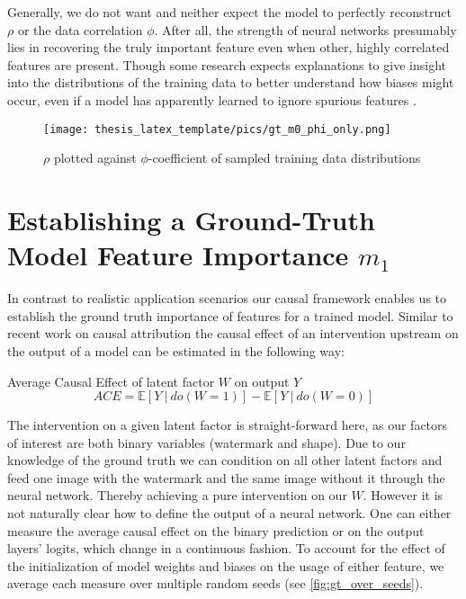 Generally, we do not want and neither expect the model to perfectly reconstruct $\rho$ or the data correlation $\phi$. After all, the strength of neural networks presumably lies in recovering the truly important feature even when other, highly correlated features are present. Though some research expects explanations to give insight into the distributions of the training data to better understand how biases might occur, even if a model has apparently learned to ignore spurious features \cite{Kindermans2017}. 

\begin{figure}
    \centering
    \texttt{[image: thesis\_latex\_template/pics/gt\_m0\_phi\_only.png]}
    \caption[Choosing measure for $m_0$]{$\rho$ plotted against $\phi$-coefficient of sampled training data distributions }
    \label{fig:finding_rho}
\end{figure}

\section{Establishing a Ground-Truth Model Feature Importance $m_1$}\label{section:gt_measure}
In contrast to realistic application scenarios our causal framework enables us to establish the ground truth importance of features for a trained model. Similar to recent work on causal attribution \cite{Goyal2019,Parafita2019,Karimi2023} the causal effect of an intervention upstream on the output of a model can be estimated in the following way:
\begin{center}
Average Causal Effect of latent factor $W$ on output $Y$ \\
\begin{equation}
\displaystyle ACE = \mathbb{E} [ Y \ | \ do(W=1) ] - \mathbb{E} [ Y \ | \ do(W=0) ] 
\end{equation}
\end{center}
The intervention on a given latent factor is straight-forward here, as our factors of interest are both binary variables (watermark and shape). Due to our knowledge of the ground truth we can condition on all other latent factors and feed one image with the watermark and the same image without it through the neural network. Thereby achieving a pure intervention on our $W$.  
However it is not naturally clear how to define the output of a neural network. One can either measure the average causal effect on the binary prediction or on the output layers' logits, which change in a continuous fashion.
To account for the effect of the initialization of model weights and biases on the usage of either feature, we average each measure over multiple random seeds (see \cref{fig:gt_over_seeds}).

